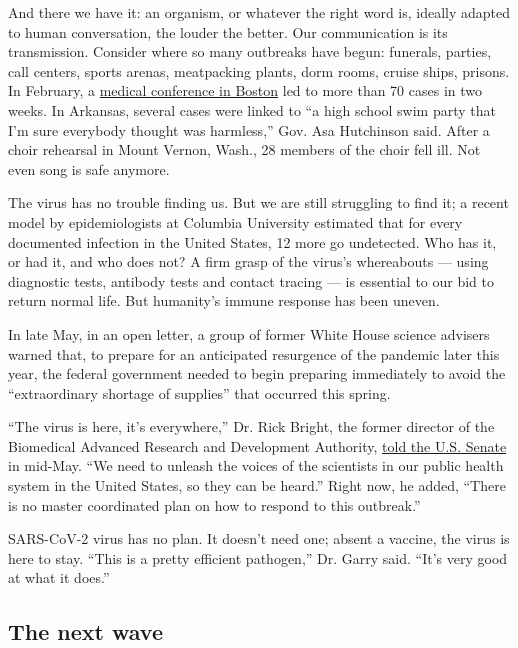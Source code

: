 And there we have it: an organism, or whatever the right word is,
ideally adapted to human conversation, the louder the better. Our
communication is its transmission. Consider where so many outbreaks have
begun: funerals, parties, call centers, sports arenas, meatpacking
plants, dorm rooms, cruise ships, prisons. In February, a
\href{https://www.nytimes.com/2020/04/12/us/coronavirus-biogen-boston-superspreader.html}{medical
conference in Boston} led to more than 70 cases in two weeks. In
Arkansas, several cases were linked to ``a high school swim party that
I'm sure everybody thought was harmless,'' Gov. Asa Hutchinson said.
After a choir rehearsal in Mount Vernon, Wash., 28 members of the choir
fell ill. Not even song is safe anymore.

The virus has no trouble finding us. But we are still struggling to find
it; a recent model by epidemiologists at Columbia University estimated
that for every documented infection in the United States, 12 more go
undetected. Who has it, or had it, and who does not? A firm grasp of the
virus's whereabouts --- using diagnostic tests, antibody tests and
contact tracing --- is essential to our bid to return normal life. But
humanity's immune response has been uneven.

In late May, in an open letter, a group of former White House science
advisers warned that, to prepare for an anticipated resurgence of the
pandemic later this year, the federal government needed to begin
preparing immediately to avoid the ``extraordinary shortage of
supplies'' that occurred this spring.

``The virus is here, it's everywhere,'' Dr. Rick Bright, the former
director of the Biomedical Advanced Research and Development Authority,
\href{https://www.rev.com/blog/transcripts/dr-rick-bright-testimony-transcript-vaccine-expert-whistleblower-ousted-by-trump-testifies}{told
the U.S. Senate} in mid-May. ``We need to unleash the voices of the
scientists in our public health system in the United States, so they can
be heard.'' Right now, he added, ``There is no master coordinated plan
on how to respond to this outbreak.''

SARS-CoV-2 virus has no plan. It doesn't need one; absent a vaccine, the
virus is here to stay. ``This is a pretty efficient pathogen,'' Dr.
Garry said. ``It's very good at what it does.''

\hypertarget{the-next-wave}{%
\subsection{The next wave}\label{the-next-wave}}

